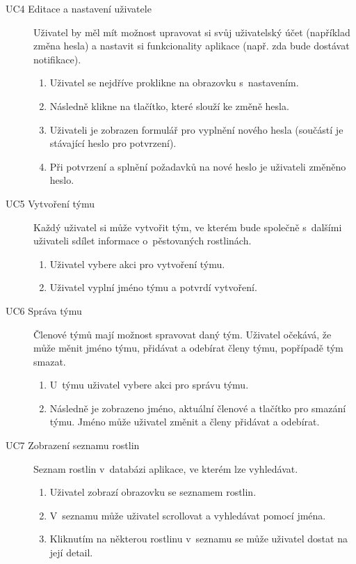 \documentclass[thesis=M,czech]{FITthesis}[2019/12/23]
\begin{document}
\begin{description}
    \item[UC4 Editace a nastavení uživatele] Uživatel by měl mít možnost upravovat si svůj uživatelský účet (například změna hesla) a nastavit si funkcionality aplikace (např. zda bude dostávat notifikace).
    \begin{enumerate}
        \item Uživatel se nejdříve proklikne na obrazovku s~nastavením.
        \item Následně klikne na tlačítko, které slouží ke změně hesla.
        \item Uživateli je zobrazen formulář pro vyplnění nového hesla (součástí je stávající heslo pro potvrzení).
        \item Při potvrzení a splnění požadavků na nové heslo je uživateli změněno heslo.
    \end{enumerate}

    \item[UC5 Vytvoření týmu] Každý uživatel si může vytvořit tým, ve kterém bude společně s~dalšími uživateli sdílet informace o~pěstovaných rostlinách.
    \begin{enumerate}
        \item Uživatel vybere akci pro vytvoření týmu.
        \item Uživatel vyplní jméno týmu a potvrdí vytvoření.
    \end{enumerate}
    
    \item[UC6 Správa týmu] Členové týmů mají možnost spravovat daný tým. Uživatel očekává, že může měnit jméno týmu, přidávat a odebírat členy týmu, popřípadě tým smazat.
    \begin{enumerate}
        \item U~týmu uživatel vybere akci pro správu týmu.
        \item Následně je zobrazeno jméno, aktuální členové a tlačítko pro smazání týmu. Jméno může uživatel změnit a členy přidávat a odebírat.
    \end{enumerate}
    
    \item[UC7 Zobrazení seznamu rostlin] Seznam rostlin v~databázi aplikace, ve kterém lze vyhledávat.
    \begin{enumerate}
        \item Uživatel zobrazí obrazovku se seznamem rostlin.
        \item V~seznamu může uživatel scrollovat a vyhledávat pomocí jména.
        \item Kliknutím na některou rostlinu v~seznamu se může uživatel dostat na její detail.
    \end{enumerate}
    

\end{description}
\end{document}
